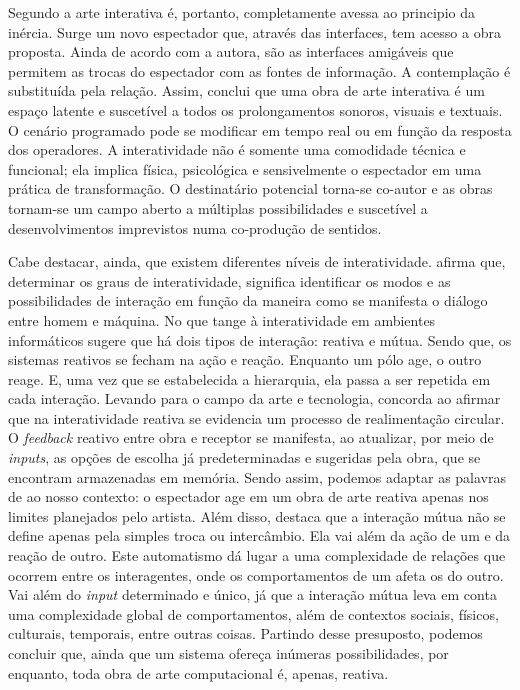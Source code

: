 Segundo  a arte interativa é, portanto, completamente avessa ao principio da inércia. Surge um novo espectador que, através das interfaces, tem acesso a obra proposta. Ainda de acordo com a autora, são as interfaces amigáveis que permitem as trocas do espectador com as fontes de informação. A contemplação é substituída pela relação. Assim,  conclui que uma obra de arte interativa é um espaço latente e suscetível a todos os prolongamentos sonoros, visuais e textuais. O cenário programado pode se modificar em tempo real ou em função da resposta dos operadores. A interatividade não é somente uma comodidade técnica e funcional; ela implica física, psicológica e sensivelmente o espectador em uma prática de transformação. O destinatário potencial torna-se co-autor e as obras tornam-se um campo aberto a múltiplas possibilidades e suscetível a desenvolvimentos imprevistos numa co-produção de sentidos.

Cabe destacar, ainda, que existem diferentes níveis de interatividade.  afirma que, determinar os graus de interatividade, significa identificar os modos e as possibilidades de interação em função da maneira como se manifesta o diálogo entre homem e máquina. No que tange à interatividade em ambientes informáticos  sugere que há dois tipos de interação: reativa e mútua. Sendo que,  os sistemas reativos se fecham na ação e reação. Enquanto um pólo age, o outro reage. E, uma vez que se estabelecida a hierarquia, ela passa a ser repetida em cada interação. Levando para o campo da arte e tecnologia,  concorda ao afirmar que na interatividade reativa se evidencia um processo de realimentação circular. O \textit{feedback} reativo entre obra e receptor se manifesta, ao atualizar, por meio de \textit{inputs}, as opções de escolha já predeterminadas e sugeridas pela obra, que se encontram armazenadas em memória. Sendo assim, podemos adaptar as palavras de  ao nosso contexto: o espectador age em um obra de arte reativa apenas nos limites planejados pelo artista. Além disso,  destaca que a interação mútua não se define apenas pela simples troca ou intercâmbio. Ela vai além da ação de um e da reação de outro. Este automatismo dá lugar a uma complexidade de relações que ocorrem entre os interagentes, onde os comportamentos de um afeta os do outro. Vai além do \textit{input} determinado e único, já que a interação mútua leva em conta uma complexidade global de comportamentos, além de contextos sociais, físicos, culturais, temporais, entre outras coisas. Partindo desse presuposto, podemos concluir que, ainda que um sistema ofereça inúmeras possibilidades, por enquanto, toda obra de arte computacional é, apenas, reativa.


